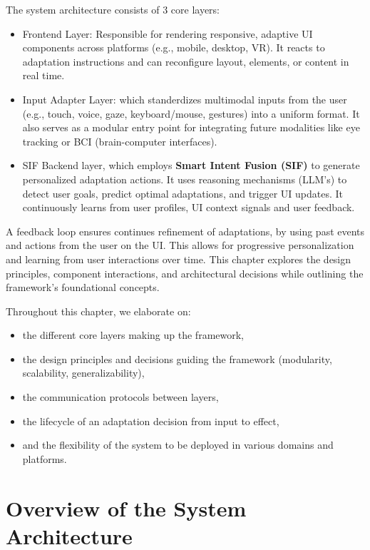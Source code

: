 \documentclass[openany]{book}
\begin{document}
The system architecture consists of 3 core layers:
\begin{itemize}
    \item Frontend Layer: Responsible for rendering responsive, adaptive UI components across platforms (e.g., mobile, desktop, VR). It reacts to adaptation instructions and can reconfigure layout, elements, or content in real time.
    \item Input Adapter Layer: which standerdizes multimodal inputs from the user (e.g., touch, voice, gaze, keyboard/mouse, gestures) into a uniform format. It also serves as a modular entry point for integrating future modalities like eye tracking or BCI (brain-computer interfaces).
    \item SIF Backend layer, which employs \textbf{Smart Intent Fusion (SIF)} to generate personalized adaptation actions. It uses reasoning mechanisms (LLM's) to detect user goals, predict optimal adaptations, and trigger UI updates. It continuously learns from user profiles, UI context signals and user feedback.
\end{itemize}

A feedback loop ensures continues refinement of adaptations, by using past events and actions from the user on the UI. This allows for progressive personalization and learning from user interactions over time. This chapter explores the design principles, component interactions, and architectural decisions while outlining the framework's foundational concepts. 

Throughout this chapter, we elaborate on:
\begin{itemize}
    \item the different core layers making up the framework, 
    \item the design principles and decisions guiding the framework (modularity, scalability, generalizability),
    \item the communication protocols between layers,
    \item the lifecycle of an adaptation decision from input to effect,
    \item and the flexibility of the system to be deployed in various domains and platforms.
\end{itemize}


\newpage
\section{Overview of the System Architecture}
\end{document}
